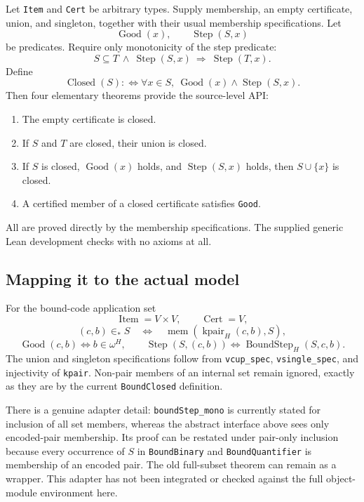 \documentclass[11pt,letterpaper]{article}
\newcommand{\code}[1]{\nolinkurl{#1}}
\begin{document}
Let \code{Item} and \code{Cert} be arbitrary types. Supply membership, an empty certificate, union, and singleton, together with their usual membership specifications. Let
\[
 \operatorname{Good}(x),\qquad \operatorname{Step}(S,x)
\]
be predicates. Require only monotonicity of the step predicate:
\[
 S\subseteq T\ \land\ \operatorname{Step}(S,x)
 \ \Longrightarrow\ \operatorname{Step}(T,x).
\]
Define
\[
 \operatorname{Closed}(S):\!\Longleftrightarrow
 \forall x\in S,\ \operatorname{Good}(x)\land\operatorname{Step}(S,x).
\]
Then four elementary theorems provide the source-level API:
\begin{enumerate}
\item The empty certificate is closed.
\item If $S$ and $T$ are closed, their union is closed.
\item If $S$ is closed, $\operatorname{Good}(x)$ holds, and $\operatorname{Step}(S,x)$ holds, then $S\cup\{x\}$ is closed.
\item A certified member of a closed certificate satisfies \code{Good}.
\end{enumerate}
All are proved directly by the membership specifications. The supplied generic Lean development checks with no axioms at all.

\subsection{Mapping it to the actual model}

For the bound-code application set
\[
 \operatorname{Item}=V\times V,\qquad \operatorname{Cert}=V,
\]
\[
 (c,b)\in_* S\quad\Longleftrightarrow\quad
 \operatorname{mem}(\operatorname{kpair}_H(c,b),S),
\]
\[
 \operatorname{Good}(c,b)\Longleftrightarrow b\in\omega^H,
 \qquad
 \operatorname{Step}(S,(c,b))\Longleftrightarrow\operatorname{BoundStep}_H(S,c,b).
\]
The union and singleton specifications follow from \code{vcup_spec}, \code{vsingle_spec}, and injectivity of \code{kpair}. Non-pair members of an internal set remain ignored, exactly as they are by the current \code{BoundClosed} definition.

There is a genuine adapter detail: \code{boundStep_mono} is currently stated for inclusion of all set members, whereas the abstract interface above sees only encoded-pair membership. Its proof can be restated under pair-only inclusion because every occurrence of $S$ in \code{BoundBinary} and \code{BoundQuantifier} is membership of an encoded pair. The old full-subset theorem can remain as a wrapper. This adapter has not been integrated or checked against the full object-module environment here.
\end{document}
